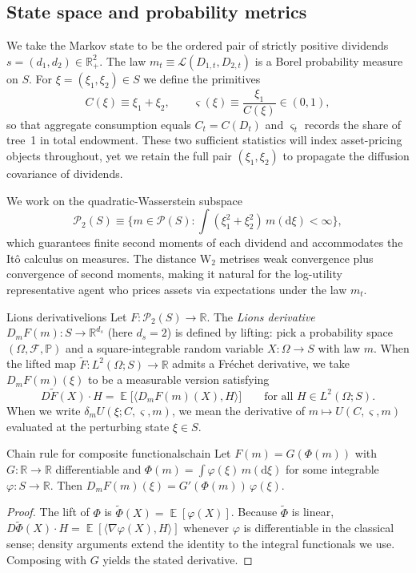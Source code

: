 ﻿\documentclass[11pt,letterpaper,oneside]{article}
\numberwithin{equation}{section}
\DeclareMathOperator{\E}{\mathbb{E}}
\newcommand{\R}{\mathbb{R}}
\newcommand{\1}{\mathbf{1}}
\newcommand{\diff}{\mathrm{d}}
\newcommand{\dmU}{\delta_m U}
\newcommand{\Dm}{D_m}
\newcommand{\ip}[2]{\langle #1,#2\rangle}
\begin{document}
\subsection{State space and probability metrics}
We take the Markov state to be the ordered pair of strictly positive dividends $s=(d_1,d_2)\in\R_+^2$. The law $m_t\equiv\mathcal L(D_{1,t},D_{2,t})$ is a Borel probability measure on $S$. For $\xi=(\xi_1,\xi_2)\in S$ we define the primitives
\[
  C(\xi)\equiv \xi_1+\xi_2,\qquad \varsigma(\xi)\equiv \frac{\xi_1}{C(\xi)}\in(0,1),
\]
so that aggregate consumption equals $C_t=C(D_t)$ and $\varsigma_t$ records the share of tree~1 in total endowment. These two sufficient statistics will index asset-pricing objects throughout, yet we retain the full pair $(\xi_1,\xi_2)$ to propagate the diffusion covariance of dividends.

We work on the quadratic-Wasserstein subspace
\[
  \mathcal P_2(S)\equiv\Big\{ m\in\mathcal P(S): \int (\xi_1^2+\xi_2^2)\, m(\diff\xi) < \infty \Big\},
\]
which guarantees finite second moments of each dividend and accommodates the It\^o calculus on measures. The distance $\mathrm W_2$ metrises weak convergence plus convergence of second moments, making it natural for the log-utility representative agent who prices assets via expectations under the law $m_t$.

\begin{definition}{Lions derivative}{lions}
Let $F:\mathcal P_2(S)\to\R$. The \emph{Lions derivative} $\Dm F(m):S\to\R^{d_s}$ (here $d_s=2$) is defined by lifting: pick a probability space $(\Omega,\mathcal F,\mathbb P)$ and a square-integrable random variable $X:\Omega\to S$ with law $m$. When the lifted map $\tilde F:L^2(\Omega;S)\to\R$ admits a Fr\'echet derivative, we take $\Dm F(m)(\xi)$ to be a measurable version satisfying
\[
  D\tilde F(X)\cdot H = \E\big[\ip{\Dm F(m)(X)}{H}\big]\qquad\text{for all }H\in L^2(\Omega;S).
\]
When we write $\dmU(\xi;C,\varsigma,m)$, we mean the derivative of $m\mapsto U(C,\varsigma,m)$ evaluated at the perturbing state $\xi\in S$.
\end{definition}

\begin{lemma}{Chain rule for composite functionals}{chain}
Let $F(m)=G(\Phi(m))$ with $G:\R\to\R$ differentiable and $\Phi(m)=\int \varphi(\xi)\,m(\diff\xi)$ for some integrable $\varphi:S\to\R$. Then $\Dm F(m)(\xi)=G'(\Phi(m))\,\varphi(\xi)$.
\end{lemma}

\begin{proof}
The lift of $\Phi$ is $\tilde\Phi(X)=\E[\varphi(X)]$. Because $\tilde\Phi$ is linear, $D\tilde\Phi(X)\cdot H=\E[\ip{\nabla \varphi(X)}{H}]$ whenever $\varphi$ is differentiable in the classical sense; density arguments extend the identity to the integral functionals we use. Composing with $G$ yields the stated derivative.
\end{proof}
\end{document}
